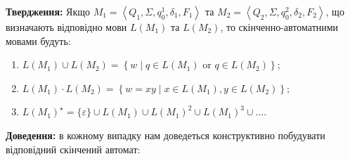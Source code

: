 \textbf{Твердження:} Якщо $M_1 = \left\langle Q_1, \Sigma, q_0^1, \delta_1, F_1 \right\rangle$ та $M_2 = \left\langle Q_2, \Sigma, q_0^2, \delta_2, F_2\right\rangle$, що визначають відповідно мови $L(M_1)$ та $L(M_2)$, то скінченно-автоматними мовами будуть:
\begin{enumerate}
	\item $L(M_1) \cup L(M_2) = \left\{w \mid q \in L(M_1) \text{ or } q \in L(M_2)\right\}$;
	\item $L(M_1) \cdot L(M_2) = \left\{w = xy \mid x \in L(M_1), y \in L(M_2) \right\}$;
	\item $L(M_1)^\star = \{\varepsilon\} \cup L(M_1) \cup L(M_1)^2 \cup L(M_1)^3 \cup \ldots$.
\end{enumerate}

\textbf{Доведення:} в кожному випадку нам доведеться конструктивно побудувати відповідний скінчений автомат:
